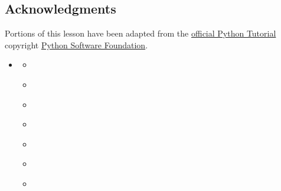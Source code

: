 \subsection{Acknowledgments}
\label{\detokenize{lesson/prg/python_intro:acknowledgments}}
Portions of this lesson have been adapted from the \href{https://docs.python.org/2/tutorial/}{official Python
Tutorial} copyright \href{http://www.python.org/}{Python Software Foundation}.

\begin{sphinxShadowBox}
\begin{itemize}
\item {} 
\label{\detokenize{lesson/prg/python_intro:id9}}{\hyperref[\detokenize{lesson/prg/python_intro:introduction-to-python}]{}}
\begin{itemize}
\item {} 
\label{\detokenize{lesson/prg/python_intro:id10}}{\hyperref[\detokenize{lesson/prg/python_intro:acknowledgments}]{}}

\item {} 
\label{\detokenize{lesson/prg/python_intro:id11}}{\hyperref[\detokenize{lesson/prg/python_intro:description}]{}}

\item {} 
\label{\detokenize{lesson/prg/python_intro:id12}}{\hyperref[\detokenize{lesson/prg/python_intro:philosophy}]{}}

\item {} 
\label{\detokenize{lesson/prg/python_intro:id13}}{\hyperref[\detokenize{lesson/prg/python_intro:features}]{}}

\item {} 
\label{\detokenize{lesson/prg/python_intro:id14}}{\hyperref[\detokenize{lesson/prg/python_intro:about-the-tutorial}]{}}

\item {} 
\label{\detokenize{lesson/prg/python_intro:id15}}{\hyperref[\detokenize{lesson/prg/python_intro:prerequisite}]{}}

\item {} 
\label{\detokenize{lesson/prg/python_intro:id16}}{\hyperref[\detokenize{lesson/prg/python_intro:dependencies}]{}}


\end{itemize}
\end{itemize}
\end{sphinxShadowBox}
